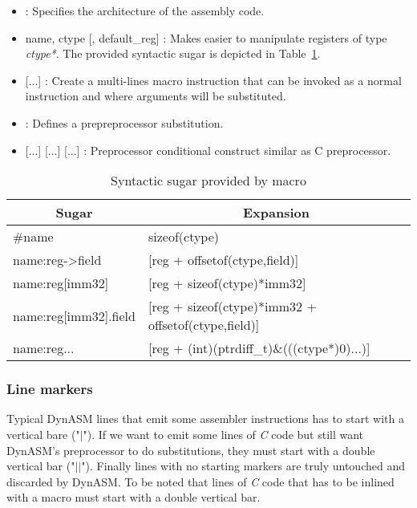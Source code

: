\begin{itemize}
    \item {} : Specifies the architecture of the assembly code.
    \item {} name, ctype [, default\_reg] : Makes easier to manipulate registers of type \emph{ctype*}. The provided syntactic sugar is depicted in
Table~\ref{tab:type-sugar}.
    \item {} [...]  : Create a multi-lines
macro instruction that can be invoked as a normal instruction and where arguments
will be substituted.
    \item {} : Defines a prepreprocessor substitution.
    \item {} [...]  [...]  [...]  : Preprocessor conditional construct similar as C preprocessor.
\end{itemize}

\begin{table}
\centering
\begin{tabular}{|l|l|}
\hline
\multicolumn{1}{|c|}{Sugar} & \multicolumn{1}{c|}{Expansion} \\\hline
\#name                      & sizeof(ctype)\\
name:reg-\textgreater field & [reg + offsetof(ctype,field)]\\
name:reg[imm32]             & [reg + sizeof(ctype)*imm32]\\
name:reg[imm32].field       & [reg + sizeof(ctype)*imm32 + offsetof(ctype,field)]\\
name:reg...                 & [reg + (int)(ptrdiff\_t)\&(((ctype*)0)...)]\\\hline
\end{tabular}
\caption{Syntactic sugar provided by  macro}
\label{tab:type-sugar}
\end{table}

\subsubsection{Line markers}
Typical DynASM lines that emit some assembler instructions has to start with a
vertical bare ("$\vert$"). If we want to emit some lines of \emph{C} code but
still want DynASM's preprocessor to do substitutions, they must start with a double vertical bar ("$\vert\vert$"). Finally lines with no starting markers are
truly untouched and discarded by DynASM. To be noted that lines of \emph{C} code that
has to be inlined with a macro must start with a double vertical bar. \\

